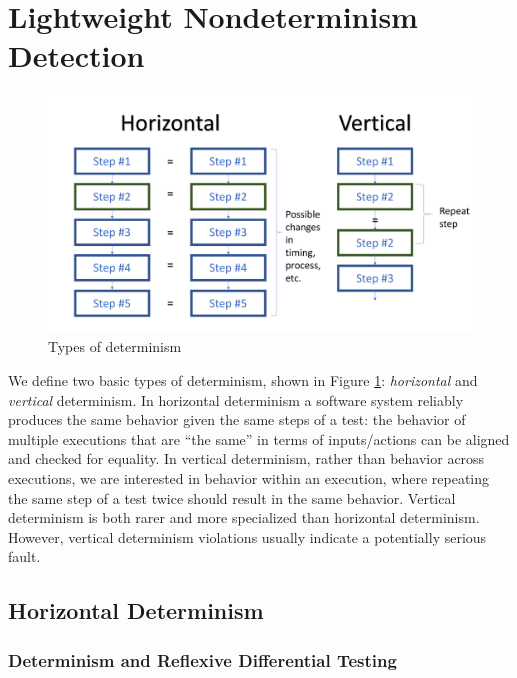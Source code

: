 \section{Lightweight Nondeterminism
  Detection}

\begin{figure}
  \centering
\includegraphics[width=0.6\columnwidth]{types}
\caption{Types of determinism}
\label{fig:types}
\end{figure}

We define two basic types of determinism, shown in Figure
\ref{fig:types}:  \emph{horizontal} and \emph{vertical} determinism.  In
horizontal determinism a software system reliably
produces the same behavior given the same steps of a test: the
behavior of multiple executions that are ``the same'' in terms of
inputs/actions can be aligned and checked for equality.  In
vertical determinism, rather than behavior across executions, we are
interested in behavior within an execution, where repeating the same
step of a test twice should result in the same behavior.  Vertical determinism is both rarer and more specialized than
horizontal determinism.  However, vertical
determinism violations usually indicate a potentially serious fault.

\subsection{Horizontal Determinism}


\subsubsection{Determinism and Reflexive Differential Testing}

